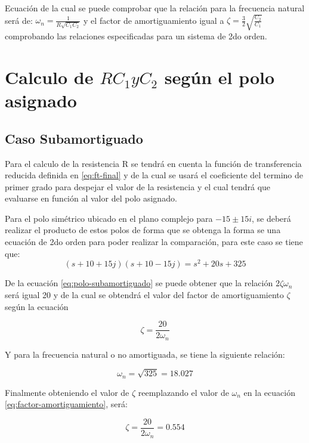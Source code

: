 \documentclass[conference]{IEEEtran}
\begin{document}
	Ecuación de la cual se puede comprobar que la relación para la frecuencia natural será de: $\omega_n =\frac{1}{R \sqrt{C_1 C_2}}$ y el factor de amortiguamiento igual a $\zeta = \frac{3}{2} \sqrt{\frac{C_2}{C_1}}$ comprobando las relaciones especificadas para un sistema de 2do orden.
	
	\section{Calculo de $R C_1 y C_2$ según el polo asignado}
	\subsection{Caso Subamortiguado}
	
	Para el calculo de la resistencia R se tendrá en cuenta la función de transferencia reducida definida en \ref{eq:ft-final} y de la cual se usará el coeficiente del termino de primer grado para despejar el valor de la resistencia y el cual tendrá que evaluarse en función al valor del polo asignado.
	
	Para el polo simétrico ubicado en el plano complejo para $-15 \pm 15i$, se deberá realizar el producto de estos polos de forma que se obtenga la forma se una ecuación de 2do orden para poder realizar la comparación, para este caso se tiene que:
	\begin{equation}
		(s + 10 + 15j)(s + 10 - 15j) = s^2 + 20s + 325
		\label{eq:polo-subamortiguado}
	\end{equation}
	
	De la ecuación \ref{eq:polo-subamortiguado} se puede obtener que la relación $2\zeta \omega_n$ será igual 20 y de la cual se obtendrá el valor del factor de amortiguamiento $\zeta$ según la ecuación
	
	\begin{equation}
		\zeta = \frac{20}{2 \omega_n}
		\label{eq:factor-amortiguamiento}
	\end{equation}
	
	Y para la frecuencia natural o no amortiguada, se tiene la siguiente relación:
	
	\begin{equation}
		\omega_n = \sqrt{325} = 18.027
		\label{eq:frecuencia-natural}
	\end{equation}
	
	Finalmente obteniendo el valor de $\zeta$ reemplazando el valor de $\omega_n$ en la ecuación \ref{eq:factor-amortiguamiento}, será:
	
	\begin{equation}
		\zeta = \frac{20}{ 2 \omega_n} = 0.554
	\end{equation}
	
\end{document}

